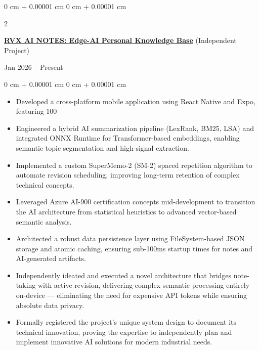 \documentclass[10pt, letterpaper]{article}
\newenvironment{highlights}{
    \begin{itemize}[
        topsep=0.10 cm,
        parsep=0.10 cm,
        partopsep=0pt,
        itemsep=0pt,
        leftmargin=0 cm + 10pt
    ]
}{
    \end{itemize}
} %
\newenvironment{onecolentry}{
    \begin{adjustwidth}{
        0 cm + 0.00001 cm
    }{
        0 cm + 0.00001 cm
    }
}{
    \end{adjustwidth}
} %
\newenvironment{twocolentry}[2][]{
    \onecolentry
    \def\secondColumn{#2}
    \setcolumnwidth{\fill, 4.5 cm}
    \begin{paracol}{2}
}{
    \switchcolumn \raggedleft \secondColumn
    \end{paracol}
    \endonecolentry
} %
\begin{document}
    \begin{twocolentry}{Jan 2026 – Present}
        \textbf{\href{https://github.com/VaranasiRahul/RVX-AI-NOTES-PUBLIC}{RVX AI NOTES: Edge-AI Personal Knowledge Base}} (Independent Project)
    \end{twocolentry}
    \vspace{0.10 cm}
    \begin{onecolentry}
        \begin{highlights}
            \item Developed a cross-platform mobile application using React Native and Expo, featuring 100%
            \item Engineered a hybrid AI summarization pipeline (LexRank, BM25, LSA) and integrated ONNX Runtime for Transformer-based embeddings, enabling semantic topic segmentation and high-signal extraction.
            \item Implemented a custom SuperMemo-2 (SM-2) spaced repetition algorithm to automate revision scheduling, improving long-term retention of complex technical concepts.
            \item Leveraged Azure AI-900 certification concepts mid-development to transition the AI architecture from statistical heuristics to advanced vector-based semantic analysis.
            \item Architected a robust data persistence layer using FileSystem-based JSON storage and atomic caching, ensuring sub-100ms startup times for notes and AI-generated artifacts.
            \item Independently ideated and executed a novel architecture that bridges note-taking with active revision, delivering complex semantic processing entirely on-device --- eliminating the need for expensive API tokens while ensuring absolute data privacy.
            \item Formally registered the project's unique system design to document its technical innovation, proving the expertise to independently plan and implement innovative AI solutions for modern industrial needs.
        \end{highlights}
    \end{onecolentry}

    \vspace{0.2 cm}
\end{document}

